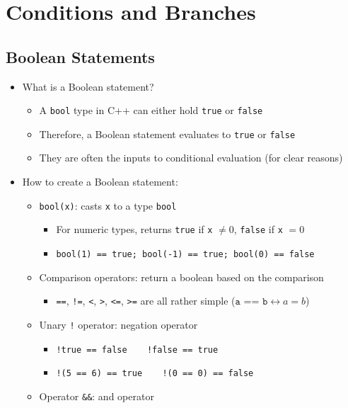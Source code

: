\documentclass{article}
\begin{document}
\section{Conditions and Branches}

\subsection{Boolean Statements}

\begin{itemize}
	\item What is a Boolean statement?
	\begin{itemize}
		\item A \texttt{bool} type in C++ can either hold \texttt{true} or \texttt{false}
		\item Therefore, a Boolean statement evaluates to \texttt{true} or \texttt{false}
		\item They are often the inputs to conditional evaluation (for clear reasons)
	\end{itemize}
	\item How to create a Boolean statement:
	\begin{itemize}
		\item \texttt{bool(x)}: casts \texttt{x} to a type \texttt{bool}
		\begin{itemize}
			\item For numeric types, returns \texttt{true} if \texttt{x} $\neq 0$, \texttt{false} if \texttt{x} $ = 0$
			\item \texttt{bool(1) == true;    bool(-1) == true;    bool(0) == false}
		\end{itemize}
		\item Comparison operators: return a boolean based on the comparison
		\begin{itemize}
			\item \texttt{==}, \texttt{!=}, \texttt{<}, \texttt{>}, \texttt{<=}, \texttt{>=} are all rather simple ($\texttt{a == b} \leftrightarrow a=b$)
		\end{itemize}
		\item Unary \texttt{!} operator: negation operator
		\begin{itemize}
			\item \texttt{!true == false $\quad$ !false == true}
			\item \texttt{!(5 == 6) == true $\quad$ !(0 == 0) == false}
		\end{itemize}
		\item Operator \texttt{\&\&}: and operator

\end{itemize}
\end{itemize}
\end{document}
